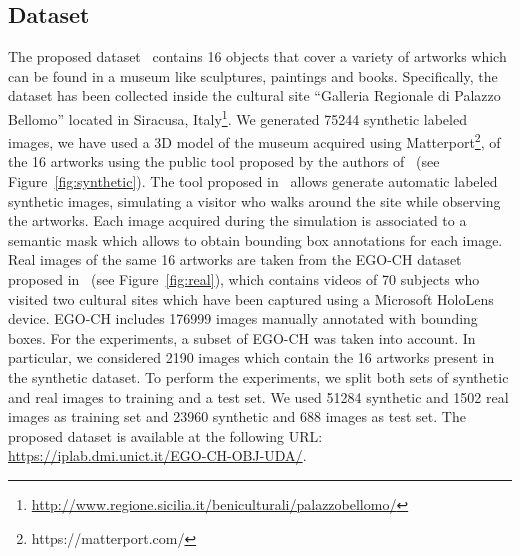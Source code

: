 \documentclass[preprint]{elsarticle}
\begin{document}
\subsection{Dataset}
The proposed dataset~\cite{pasqualino2020unsupervised} contains 16 objects that cover a variety of artworks which can be found in a museum like sculptures, paintings and books. Specifically, the dataset has been collected inside the cultural site ``Galleria Regionale di Palazzo Bellomo'' located in Siracusa, Italy\footnote{\url{http://www.regione.sicilia.it/beniculturali/palazzobellomo/}}. We generated 75244 synthetic labeled images, we have used a 3D model of the museum acquired using Matterport\footnote{https://matterport.com/}, of the 16 artworks using the public tool proposed by the authors of~\cite{orlando2020egocentric} (see Figure~\ref{fig:synthetic}). The tool proposed in~\cite{orlando2020egocentric} allows generate automatic labeled synthetic images, simulating a visitor who walks around the site while observing the artworks. Each image acquired during the simulation is associated to a semantic mask which allows to obtain bounding box annotations for each image. Real images of the same 16 artworks are taken from the EGO-CH dataset proposed in~\cite{Ragusa_2020} (see Figure~\ref{fig:real}), which contains videos of 70 subjects who visited two cultural sites which have been captured using a Microsoft HoloLens device. EGO-CH includes 176999 images manually annotated with bounding boxes. For the experiments, a subset of EGO-CH was taken into account. In particular, we considered 2190 images which contain the 16 artworks present in the synthetic dataset. To perform the experiments, we split both sets of synthetic and real images to training and a test set. We used 51284 synthetic and 1502 real images as training set and 23960 synthetic and 688 images as test set. The proposed dataset is available at the following URL: \url{https://iplab.dmi.unict.it/EGO-CH-OBJ-UDA/}.
\end{document}
